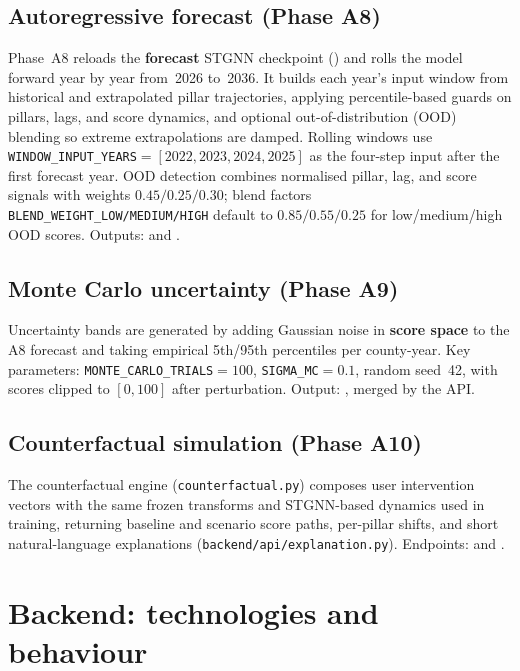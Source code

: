 \documentclass[11pt,a4paper]{article}
\begin{document}
\subsection{Autoregressive forecast (Phase A8)}
Phase~A8 reloads the \textbf{forecast} STGNN checkpoint () and rolls the model forward year by year from~2026 to~2036. It builds each year's input window from historical and extrapolated pillar trajectories, applying percentile-based guards on pillars, lags, and score dynamics, and optional out-of-distribution (OOD) blending so extreme extrapolations are damped. Rolling windows use \texttt{WINDOW\_INPUT\_YEARS}${}=[2022,2023,2024,2025]$ as the four-step input after the first forecast year. OOD detection combines normalised pillar, lag, and score signals with weights $0.45/0.25/0.30$; blend factors \texttt{BLEND\_WEIGHT\_LOW/MEDIUM/HIGH} default to $0.85/0.55/0.25$ for low/medium/high OOD scores. Outputs:  and .

\subsection{Monte Carlo uncertainty (Phase A9)}
Uncertainty bands are generated by adding Gaussian noise in \textbf{score space} to the A8 forecast and taking empirical 5th/95th percentiles per county-year. Key parameters: \texttt{MONTE\_CARLO\_TRIALS}${}=100$, \texttt{SIGMA\_MC}${}=0.1$, random seed~42, with scores clipped to $[0,100]$ after perturbation. Output: , merged by the  API.

\subsection{Counterfactual simulation (Phase A10)}
The counterfactual engine (\texttt{counterfactual.py}) composes user intervention vectors with the same frozen transforms and STGNN-based dynamics used in training, returning baseline and scenario score paths, per-pillar shifts, and short natural-language explanations (\texttt{backend/api/explanation.py}). Endpoints:  and .

\section{Backend: technologies and behaviour}
\end{document}
